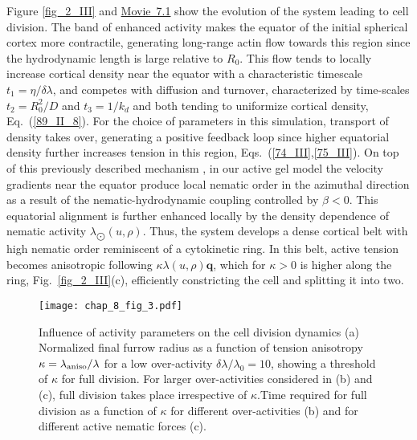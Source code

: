 {Figure \ref{fig_2_III} and \href{https://github.com/waleedmirzaPhD/movies_thesis.git}{Movie~7.1} show the evolution of the system leading to cell division. The band of enhanced activity makes the equator of the initial spherical cortex more contractile, generating long-range actin flow towards this region since the hydrodynamic length is large relative to $R_0$. This flow tends to locally increase cortical density near the equator  with a characteristic timescale $t_1 = \eta/ \delta\lambda$, and competes with diffusion and turnover, characterized by time-scales $t_2 = R_0^2/D$ and $t_3 = 1/k_d$ and both tending to uniformize cortical density, Eq.~(\ref{89_II_8}). For the choice of parameters in this simulation, transport of density takes over, generating a positive feedback loop since higher equatorial density further increases tension in this region, Eqs.~(\ref{74_III},\ref{75_III}). On top of this previously described mechanism  \cite{turlier2014}, in our active gel model the velocity gradients near the equator produce local nematic order in the azimuthal direction as a result of the nematic-hydrodynamic coupling controlled by $\beta<0$. This equatorial alignment is further enhanced locally by the density dependence of nematic activity $\lambda_{\bigodot}(u,\rho)$. Thus, the system develops a dense cortical belt with high nematic order reminiscent of a cytokinetic ring. In this belt, active tension becomes anisotropic following $\kappa\lambda(u,\rho) \bm{q}$, which for $\kappa >0$ is higher along the ring, Fig.~\ref{fig_2_III}(c), efficiently constricting the cell and splitting it into two.



\begin{figure}[h!]
\centering
\texttt{[image: chap\_8\_fig\_3.pdf]}
\caption{Influence of activity parameters on the cell division dynamics (a) Normalized final furrow radius as a function of tension anisotropy $\kappa = \lambda_{\rm aniso}/\lambda$ for a low over-activity $\delta\lambda/\lambda_0 = 10$, showing a threshold of $\kappa$ for full division. For larger over-activities considered in (b) and (c), full division takes place irrespective of $\kappa$.Time required for full division as a function of $\kappa$ for different over-activities (b) and for different active nematic forces (c). }
\label{fig_3_III}
\end{figure} 

}
